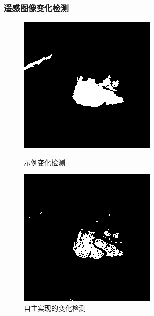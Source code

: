 \subsubsection{遥感图像变化检测}
\begin{figure}[H]
	\centering
	\begin{minipage}{0.45\linewidth}
		\includegraphics[width=\linewidth]{figure/san_gt.bmp}
		\caption{示例变化检测}
	\end{minipage}
	\begin{minipage}{0.45\linewidth}
		\includegraphics[width=\linewidth]{figure/exp2compare.png}
		\caption{自主实现的变化检测}
	\end{minipage}
\end{figure}